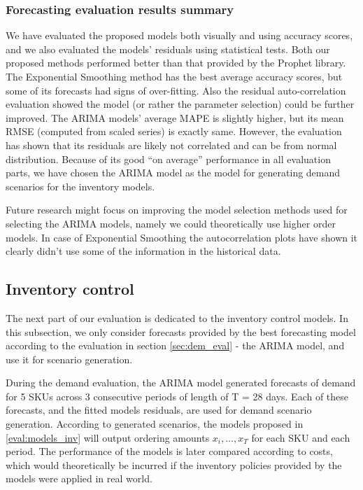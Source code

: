 \documentclass[11pt,a4paper]{article}
\begin{document}
\subsubsection{Forecasting evaluation results summary}
We have evaluated the proposed models both visually and using accuracy scores, and we also evaluated the models' residuals using statistical tests. Both our proposed methods performed better than that provided by the Prophet library. The Exponential Smoothing method has the best average accuracy scores, but some of its forecasts had signs of over-fitting. Also the residual auto-correlation evaluation showed the model (or rather the parameter selection) could be further improved. The ARIMA models' average MAPE is slightly higher, but its mean RMSE (computed from scaled series) is exactly same. However, the evaluation has shown that its residuals are likely not correlated and can be from normal distribution. Because of its good ``on average'' performance in all evaluation parts, we have chosen the ARIMA model as the model for generating demand scenarios for the inventory models.

Future research might focus on improving the model selection methods used for selecting the ARIMA models, namely we could theoretically use higher order models. In case of Exponential Smoothing the autocorrelation plots have shown it clearly didn't use some of the information in the historical data.



\subsection{Inventory control}
The next part of our evaluation is dedicated to the inventory control models. In this subsection, we only consider forecasts provided by the best forecasting model according to the evaluation in section \ref{sec:dem_eval} - the ARIMA model, and use it for scenario generation.

During the demand evaluation, the ARIMA model generated forecasts of demand for 5 SKUs across 3 consecutive periods of length of T = 28 days. Each of these forecasts, and the fitted models residuals, are used for demand scenario generation. According to generated scenarios, the models proposed in \ref{eval:models_inv} will output ordering amounts $x_i,\dots, x_T$ for each SKU and each period. The performance of the models is later compared according to costs, which would theoretically be incurred if the inventory policies provided by the models were applied in real world. 
\end{document}
